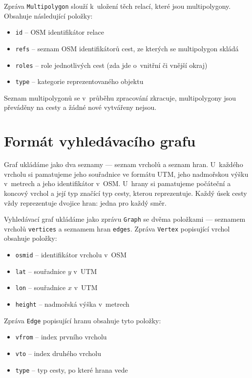 Zpráva \verb|Multipolygon| slouží k~uložení těch relací, které jsou
multipolygony. Obsahuje následující položky:
\begin{itemize}
	\item \verb|id| -- OSM identifikátor relace
	\item \verb|refs| -- seznam OSM identifikátorů cest, ze kterých se
	multipolygon skládá
	\item \verb|roles| -- role jednotlivých cest (zda jde o~vnitřní či vnější
	okraj)
	\item \verb|type| -- kategorie reprezentovaného objektu
\end{itemize}
Seznam multipolygonů se v~průběhu zpracování zkracuje, multipolygony jsou
převáděny na cesty a žádné nové vytvářeny nejsou.



\section{Formát vyhledávacího grafu}
Graf ukládáme jako dva seznamy --- seznam vrcholů a seznam hran. U~každého
vrcholu si pamatujeme jeho souřadnice ve formátu UTM, jeho nadmořskou výšku
v~metrech a jeho identifikátor v~OSM. U~hrany si pamatujeme počáteční a koncový
vrchol a její typ značící typ cesty, kterou reprezentuje. Každý úsek cesty vždy
reprezentuje dvojice hran: jedna pro každý směr.

Vyhledávací graf ukládáme jako zprávu \verb|Graph| se dvěma položkami ---
seznamem vrcholů \verb|vertices| a seznamem hran \verb|edges|. Zpráva
\verb|Vertex| popisující vrchol obsahuje položky:
\begin{itemize}
	\item \verb|osmid| -- identifikátor vrcholu v~OSM
	\item \verb|lat| -- souřadnice $y$ v~UTM
	\item \verb|lon| -- souřadnice $x$ v~UTM
	\item \verb|height| -- nadmořská výška v~metrech
\end{itemize}
Zpráva \verb|Edge| popisující hranu obsahuje tyto položky:
\begin{itemize}
	\item \verb|vfrom| -- index prvního vrcholu
	\item \verb|vto| -- index druhého vrcholu
	\item \verb|type| -- typ cesty, po které hrana vede
\end{itemize}

